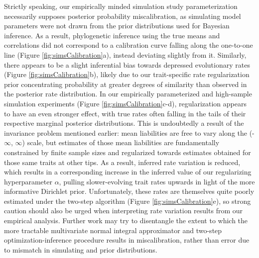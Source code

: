 \documentclass[10pt, twocolumn, twoside]{article}
\begin{document}
Strictly speaking, our empirically minded simulation study parameterization necessarily supposes posterior probability miscalibration, as simulating model parameters were not drawn from the prior distributions used for Bayesian inference. As a result, phylogenetic inference using the true means and correlations did not correspond to a calibration curve falling along the one-to-one line (Figure \ref{fig:simsCalibration}a), instead deviating slightly from it.   Similarly, there appears to be a slight inferential bias towards depressed evolutionary rates (Figure \ref{fig:simsCalibration}b), likely due to our trait-specific rate regularization prior concentrating probability at greater degrees of similarity than observed in the posterior rate distribution. In our empirically parameterized and high-sample simulation experiments (Figure \ref{fig:simsCalibration}c-d), regularization appears to have an even stronger effect, with true rates often falling in the tails of their respective marginal posterior distributions. This is undoubtedly a result of the invariance problem mentioned earlier: mean liabilities are free to vary along the (-$\infty$, $\infty$) scale, but estimates of those mean liabilities are fundamentally constrained by finite sample sizes and regularized towards estimates obtained for those same traits at other tips. As a result, inferred rate variation is reduced, which results in a corresponding increase in the inferred value of our regularizing hyperparameter $\alpha$, pulling slower-evolving trait rates upwards in light of the more informative Dirichlet prior. Unfortunately, these rates are themselves quite poorly estimated under the two-step algorithm (Figure \ref{fig:simsCalibration}e), so strong caution should also be urged when interpreting rate variation results from our empirical analysis. Further work may try to disentangle the extent to which the more tractable multivariate normal integral approximator and two-step optimization-inference procedure results in miscalibration, rather than error due to mismatch in simulating and prior distributions. 
\end{document}
